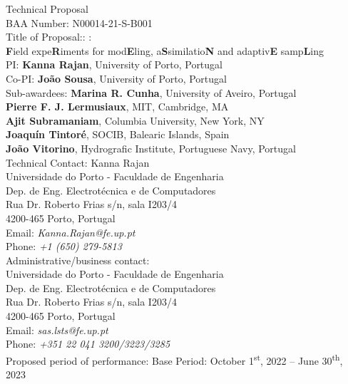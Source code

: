 \begin{titlepage}

\begin{center}
\Large
Technical Proposal\\
BAA Number: N00014-21-S-B001\\
Title of Proposal:: \proje:\\\textbf{F}ield expe\textbf{R}iments for mod\textbf{E}ling, a\textbf{S}similatio\textbf{N} and adaptiv\textbf{E} samp\textbf{L}ing\\


\vspace{+1in}
\normalsize
PI: \textbf{Kanna Rajan}, University of Porto, Portugal\\
Co-PI: \textbf{Jo\~ao Sousa}, University of Porto, Portugal\\
Sub-awardees: 
\textbf{Marina R. Cunha}, University of Aveiro, Portugal\\
\textbf{Pierre F. J. Lermusiaux}, MIT, Cambridge, MA\\
\textbf{Ajit Subramaniam}, Columbia University, New York, NY\\
\textbf{Joaqu\'{i}n Tintor\'{e}}, SOCIB, Balearic Islands, Spain\\
\textbf{Jo\~ao Vitorino}, Hydrografic Institute, Portuguese Navy, Portugal\\
\vspace{+0.5in}
Technical Contact: Kanna Rajan\\
Universidade do Porto - Faculdade de Engenharia\\
Dep. de Eng. Electrot\'{e}cnica e de Computadores\\
Rua Dr. Roberto Frias s/n, sala I203/4\\
4200-465 Porto, Portugal\\
Email: \emph{Kanna.Rajan@fe.up.pt}\\
Phone: \emph{+1 (650) 279-5813}\\
\vspace{0.5in}
Administrative/business contact: \\
Universidade do Porto - Faculdade de Engenharia\\
Dep. de Eng. Electrot\'{e}cnica e de Computadores\\
Rua Dr. Roberto Frias s/n, sala I203/4\\
4200-465 Porto, Portugal\\
Email: \emph{sas.lsts@fe.up.pt}\\
Phone: \emph{+351 22 041 3200/3223/3285}\\
\vspace{0.5in}
Proposed period of performance: Base Period: October
1\textsuperscript{st}, 2022 -- June 30\textsuperscript{th}, 2023


\end{center}
\end{titlepage}

